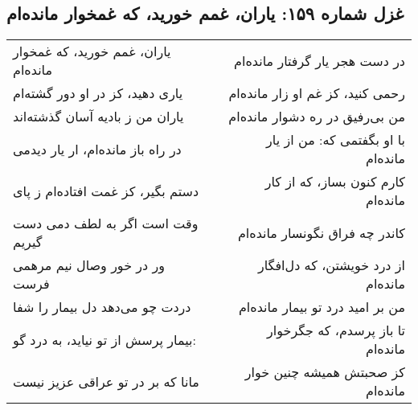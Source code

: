\begin{center}
\section*{غزل شماره ۱۵۹: یاران، غمم خورید، که غمخوار مانده‌ام}
\label{sec:159}
\begin{longtable}{l p{0.5cm} r}
یاران، غمم خورید، که غمخوار مانده‌ام
&&
در دست هجر یار گرفتار مانده‌ام
\\
یاری دهید، کز در او دور گشته‌ام
&&
رحمی کنید، کز غم او زار مانده‌ام
\\
یاران من ز بادیه آسان گذشته‌اند
&&
من بی‌رفیق در ره دشوار مانده‌ام
\\
در راه باز مانده‌ام، ار یار دیدمی
&&
با او بگفتمی که: من از یار مانده‌ام
\\
دستم بگیر، کز غمت افتاده‌ام ز پای
&&
کارم کنون بساز، که از کار مانده‌ام
\\
وقت است اگر به لطف دمی دست گیریم
&&
کاندر چه فراق نگونسار مانده‌ام
\\
ور در خور وصال نیم مرهمی فرست
&&
از درد خویشتن، که دل‌افگار مانده‌ام
\\
دردت چو می‌دهد دل بیمار را شفا
&&
من بر امید درد تو بیمار مانده‌ام
\\
بیمار پرسش از تو نیاید، به درد گو:
&&
تا باز پرسدم، که جگرخوار مانده‌ام
\\
مانا که بر در تو عراقی عزیز نیست
&&
کز صحبتش همیشه چنین خوار مانده‌ام
\\
\end{longtable}
\end{center}
